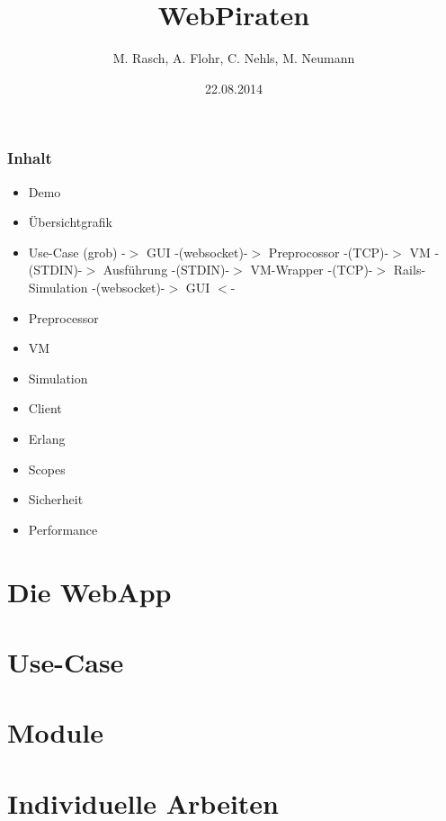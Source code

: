 \documentclass{beamer}
\begin{document}

\title{WebPiraten}  
\author{M. Rasch, A. Flohr, C. Nehls, M. Neumann}
\date{22.08.2014} 

\begin{frame}
\maketitle
\end{frame} 

\begin{frame}
\frametitle{Inhalt}
\tableofcontents
\end{frame}

\begin{frame}
\begin{itemize}
\item Demo
\item Übersichtgrafik
\item Use-Case (grob)\newline
-$>$ GUI -(websocket)-$>$ Preprocossor -(TCP)-$>$ VM -(STDIN)-$>$ Ausführung -(STDIN)-$>$ VM-Wrapper -(TCP)-$>$ Rails-Simulation -(websocket)-$>$ GUI $<$-
\item Preprocessor
\item VM
\item Simulation
\item Client
\item Erlang
\item Scopes
\item Sicherheit
\item Performance
\end{itemize}
\end{frame}

\section{Die WebApp}

\section{Use-Case}

\section{Module}






\section{Individuelle Arbeiten}





\end{document}
